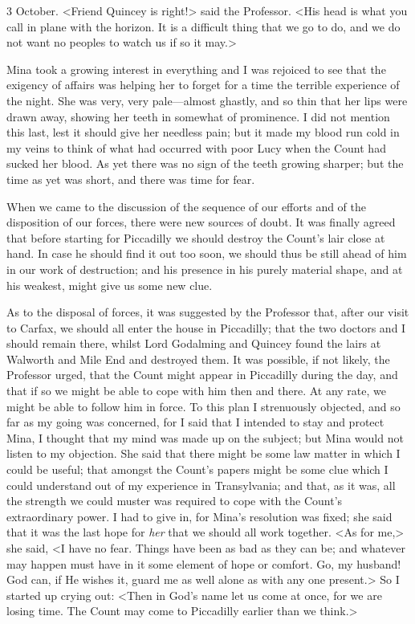 \begin{diary}{3 October.}
<Friend Quincey is right!> said the Professor. <His head is what you call in plane with the horizon. It is a difficult thing that we go to do, and we do not want no peoples to watch us if so it may.>

Mina took a growing interest in everything and I was rejoiced to see that the exigency of affairs was helping her to forget for a time the terrible experience of the night. She was very, very pale—almost ghastly, and so thin that her lips were drawn away, showing her teeth in somewhat of prominence. I did not mention this last, lest it should give her needless pain; but it made my blood run cold in my veins to think of what had occurred with poor Lucy when the Count had sucked her blood. As yet there was no sign of the teeth growing sharper; but the time as yet was short, and there was time for fear.

When we came to the discussion of the sequence of our efforts and of the disposition of our forces, there were new sources of doubt. It was finally agreed that before starting for Piccadilly we should destroy the Count's lair close at hand. In case he should find it out too soon, we should thus be still ahead of him in our work of destruction; and his presence in his purely material shape, and at his weakest, might give us some new clue.

As to the disposal of forces, it was suggested by the Professor that, after our visit to Carfax, we should all enter the house in Piccadilly; that the two doctors and I should remain there, whilst Lord Godalming and Quincey found the lairs at Walworth and Mile End and destroyed them. It was possible, if not likely, the Professor urged, that the Count might appear in Piccadilly during the day, and that if so we might be able to cope with him then and there. At any rate, we might be able to follow him in force. To this plan I strenuously objected, and so far as my going was concerned, for I said that I intended to stay and protect Mina, I thought that my mind was made up on the subject; but Mina would not listen to my objection. She said that there might be some law matter in which I could be useful; that amongst the Count's papers might be some clue which I could understand out of my experience in Transylvania; and that, as it was, all the strength we could muster was required to cope with the Count's extraordinary power. I had to give in, for Mina's resolution was fixed; she said that it was the last hope for \textit{her} that we should all work together. <As for me,> she said, <I have no fear. Things have been as bad as they can be; and whatever may happen must have in it some element of hope or comfort. Go, my husband! God can, if He wishes it, guard me as well alone as with any one present.> So I started up crying out: <Then in God's name let us come at once, for we are losing time. The Count may come to Piccadilly earlier than we think.>


\end{diary}
